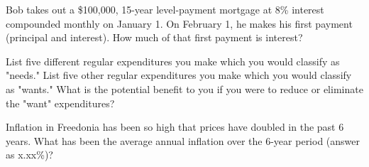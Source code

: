 \documentclass[12pt]{exam}
\begin{document}
\begin{questions}
    \question Bob takes out a \$100,000, 15-year level-payment mortgage at 8\% interest compounded monthly on January 1.
    On February 1, he makes his first payment (principal and interest).  How much of that first payment
    is interest?
    \vspace{1in}

    \question List five different regular expenditures you make which you would classify as "needs." List five
    other regular expenditures you make which you would classify as "wants." What is the potential benefit to
    you if you were to reduce or eliminate the "want" expenditures?
    \vspace{1in}

    \question Inflation in Freedonia has been so high that prices have doubled in the past 6 years.
    What has been the average annual inflation over the 6-year period (answer as x.xx\%)?
    \vspace{1in}


\end{questions}
\end{document}
